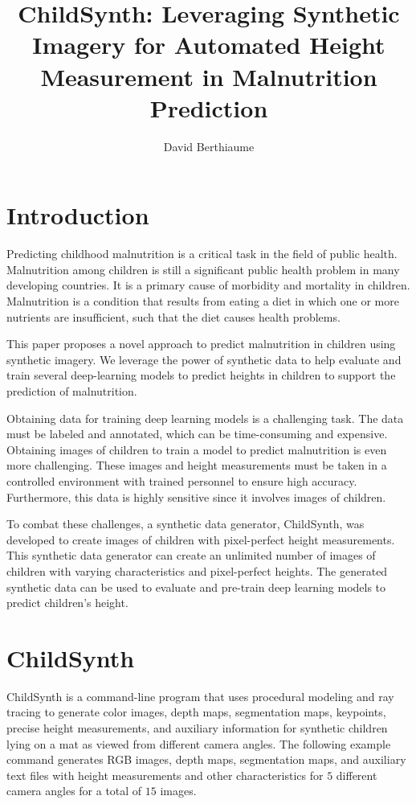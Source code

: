\documentclass{article}
\title{ChildSynth: Leveraging Synthetic Imagery for Automated Height Measurement in Malnutrition Prediction}
\author{David Berthiaume}
\begin{document}
\maketitle


\section{Introduction}

Predicting childhood malnutrition is a critical task in the field of public health. Malnutrition among children is still a significant public health problem in many developing countries. It is a primary cause of morbidity and mortality in children. Malnutrition is a condition that results from eating a diet in which one or more nutrients are insufficient, such that the diet causes health problems.

This paper proposes a novel approach to predict malnutrition in children using synthetic imagery. 
We leverage the power of synthetic data to help evaluate and train several deep-learning models to predict heights in children to support the prediction of malnutrition. 

Obtaining data for training deep learning models is a challenging task. The data must be labeled and annotated, which can be time-consuming and expensive. Obtaining images of children to train a model to predict malnutrition is even more challenging. These images and height measurements must be taken in a controlled environment with trained personnel to ensure high accuracy. Furthermore, this data is highly sensitive since it involves images of children.

To combat these challenges, a synthetic data generator, ChildSynth, was developed to create images of children with pixel-perfect height measurements. This synthetic data generator can create an unlimited number of images of children with varying characteristics and pixel-perfect heights. The generated synthetic data can be used to evaluate and pre-train deep learning models to predict children's height. 

\section{ChildSynth}

ChildSynth is a command-line program that uses procedural modeling and ray tracing to generate color images, depth maps, segmentation maps, keypoints, precise height measurements, and auxiliary information for synthetic children lying on a mat as viewed from different camera angles. The following example command generates RGB images, depth maps, segmentation maps, and auxiliary text files with height measurements and other characteristics for $5$ different camera angles for a total of $15$ images. 
\end{document}
